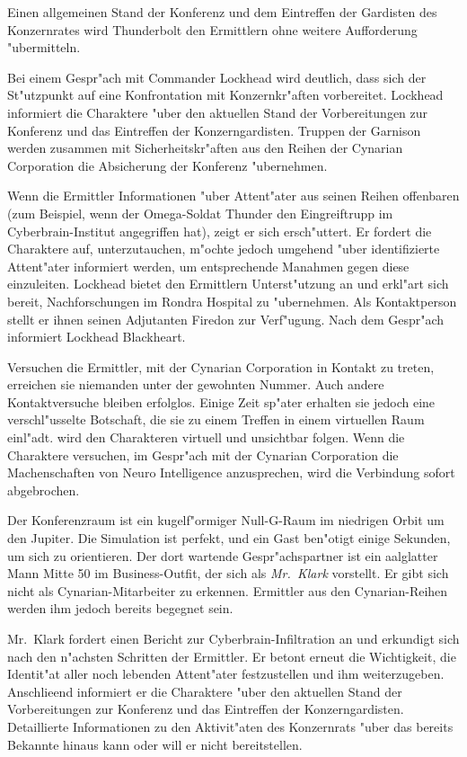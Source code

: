 Einen allgemeinen Stand der Konferenz und dem Eintreffen der Gardisten des Konzernrates wird Thunderbolt den Ermittlern ohne weitere Aufforderung "ubermitteln.

Bei einem Gespr"ach mit Commander Lockhead wird deutlich, dass sich der St"utzpunkt auf eine Konfrontation mit Konzernkr"aften vorbereitet. Lockhead informiert die Charaktere "uber den aktuellen Stand der Vorbereitungen zur Konferenz und das Eintreffen der Konzerngardisten. Truppen der Garnison werden zusammen mit Sicherheitskr"aften aus den Reihen der Cynarian Corporation die Absicherung der Konferenz "ubernehmen. 

Wenn die Ermittler Informationen "uber Attent"ater aus seinen Reihen offenbaren (zum Beispiel, wenn der Omega-Soldat Thunder den Eingreiftrupp im Cyberbrain-Institut angegriffen hat), zeigt er sich ersch"uttert. Er fordert die Charaktere auf, unterzutauchen, m"ochte jedoch umgehend "uber identifizierte Attent"ater informiert werden, um entsprechende Ma\3nahmen gegen diese einzuleiten. Lockhead bietet den Ermittlern Unterst"utzung an und erkl"art sich bereit, Nachforschungen im Rondra Hospital zu "ubernehmen. Als Kontaktperson stellt er ihnen seinen Adjutanten Firedon zur Verf"ugung. Nach dem Gespr"ach informiert Lockhead Blackheart.

Versuchen die Ermittler, mit der Cynarian Corporation in Kontakt zu treten, erreichen sie niemanden unter der gewohnten Nummer. Auch andere Kontaktversuche bleiben erfolglos. Einige Zeit sp"ater erhalten sie jedoch eine verschl"usselte Botschaft, die sie zu einem Treffen in einem virtuellen Raum einl"adt. \xl{} wird den Charakteren virtuell und unsichtbar folgen. Wenn die Charaktere versuchen, im Gespr"ach mit der Cynarian Corporation die Machenschaften von Neuro Intelligence anzusprechen, wird die Verbindung sofort abgebrochen.

Der Konferenzraum ist ein kugelf"ormiger Null-G-Raum im niedrigen Orbit um den Jupiter. Die Simulation ist perfekt, und ein Gast ben"otigt einige Sekunden, um sich zu orientieren. Der dort wartende Gespr"achspartner ist ein aalglatter Mann Mitte 50 im Business-Outfit, der sich als \emph{Mr.~Klark} vorstellt. Er gibt sich nicht als Cynarian-Mitarbeiter zu erkennen. Ermittler aus den Cynarian-Reihen werden ihm jedoch bereits begegnet sein.

Mr.~Klark fordert einen Bericht zur Cyberbrain-Infiltration an und erkundigt sich nach den n"achsten Schritten der Ermittler. Er betont erneut die Wichtigkeit, die Identit"at aller noch lebenden Attent"ater festzustellen und ihm weiterzugeben. Anschlie\3end informiert er die Charaktere "uber den aktuellen Stand der Vorbereitungen zur Konferenz und das Eintreffen der Konzerngardisten. Detaillierte Informationen zu den Aktivit"aten des Konzernrats "uber das bereits Bekannte hinaus kann oder will er nicht bereitstellen.

